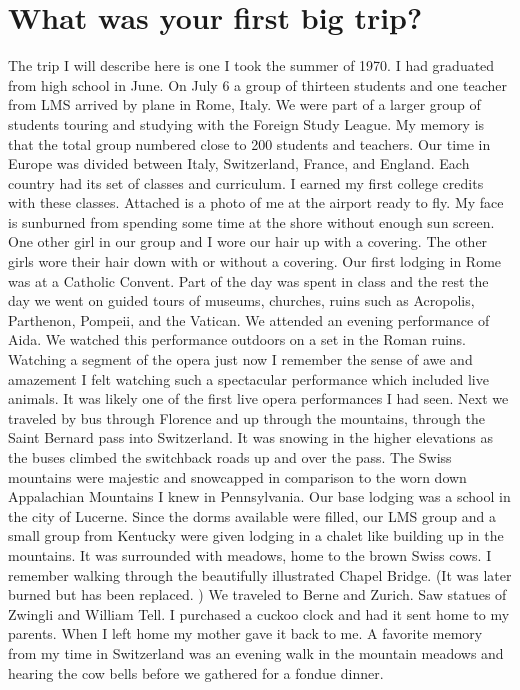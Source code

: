 \section{What was your first big trip?}
The trip I will describe here is one I took the summer of 1970.
I had graduated from high school in June.
On July 6 a group of thirteen students and one teacher from LMS arrived by plane in Rome, Italy.
We were part of a larger group of students touring and studying with the Foreign Study League.
My memory is that the total group numbered close to 200 students and teachers.
Our time in Europe was divided between Italy, Switzerland, France, and England.
Each country had its set of classes and curriculum.
I earned my first college credits with these classes.
Attached is a photo of me at the airport ready to fly.
My face is sunburned from spending some time at the shore without enough sun screen.
One other girl in our group and I wore our hair up with a covering.
The other girls wore their hair down with or without a covering.
Our first lodging in Rome was at a Catholic Convent.
Part of the day was spent in class and the rest the day we went on guided tours of museums, churches, ruins such as Acropolis, Parthenon, Pompeii, and the Vatican.
We attended an evening performance of Aida.
We watched this performance outdoors on a set in the Roman ruins.
Watching a segment of the opera just now I remember the sense of awe and amazement I felt watching such a spectacular performance which included live animals.
It was likely one of the first live opera performances I had seen.
Next we traveled by bus through Florence and up through the mountains, through the Saint Bernard pass into Switzerland.
It was snowing in the higher elevations as the buses climbed the switchback roads up and over the pass.
The Swiss mountains were majestic and snowcapped in comparison to the worn down Appalachian Mountains I knew in Pennsylvania.
Our base lodging was a school in the city of Lucerne.
Since the dorms available were filled, our LMS group and a small group from Kentucky were given lodging in a chalet like building up in the mountains.
It was surrounded with meadows, home to the brown Swiss cows.
I remember walking through the beautifully illustrated Chapel Bridge.
(It was later burned but has been replaced.
) We traveled to Berne and Zurich.
Saw statues of Zwingli and William Tell.
I purchased a cuckoo clock and had it sent home to my parents.
When I left home my mother gave it back to me.
A favorite memory from my time in Switzerland was an evening walk in the mountain meadows and hearing the cow bells before we gathered for a fondue dinner.

